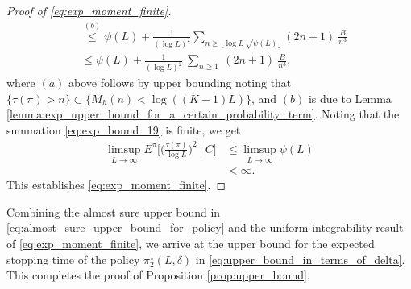 \begin{proof}[Proof of \eqref{eq:exp_moment_finite}]
\begin{align}
	&\stackrel{(b)}{\leq}\psi(L) +\frac{1}{(\log L)^2}\sum\limits_{n\geq \lfloor \log L\,\sqrt{\psi(L)}\rfloor} (2n+1)~\frac{B}{n^3}\nonumber\\
	&\leq \psi(L) +\frac{1}{(\log L)^2}~\sum\limits_{n\geq 1} ~(2n+1)~\frac{B}{n^3},
	\label{eq:exp_bound_19}
\end{align}
where $(a)$ above follows by upper bounding noting that $\{\tau(\pi)>n\}\subset \{M_h(n) < \log((K-1)L)\}$, and $(b)$ is due to Lemma \ref{lemma:exp_upper_bound_for_a_certain_probability_term}. Noting that the summation \eqref{eq:exp_bound_19} is finite, we get
\begin{align}
	\limsup\limits_{L\to\infty} E^\pi\bigg[\bigg(\frac{\tau(\pi)}{\log L}\bigg)^2~\bigg|~C\bigg] &\leq \limsup\limits_{L\to\infty} \psi(L)\nonumber\\
		&<\infty.
\end{align}
This establishes \eqref{eq:exp_moment_finite}.
\end{proof} 

{\color{black} Combining the almost sure upper bound in \eqref{eq:almost_sure_upper_bound_for_policy} and the uniform integrability result of \eqref{eq:exp_moment_finite}, we arrive at the upper bound for the expected stopping time of the policy $\pi_2^\star(L, \delta)$ in \eqref{eq:upper_bound_in_terms_of_delta}. This completes the proof {\color{black} of} Proposition \ref{prop:upper_bound}.}

